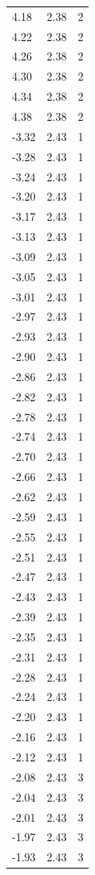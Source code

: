 \begin{longtable}{lrr}
  4.18 & 2.38 & 2 \\
  4.22 & 2.38 & 2 \\
  4.26 & 2.38 & 2 \\
  4.30 & 2.38 & 2 \\
  4.34 & 2.38 & 2 \\
  4.38 & 2.38 & 2 \\
  -3.32 & 2.43 & 1 \\
  -3.28 & 2.43 & 1 \\
  -3.24 & 2.43 & 1 \\
  -3.20 & 2.43 & 1 \\
  -3.17 & 2.43 & 1 \\
  -3.13 & 2.43 & 1 \\
  -3.09 & 2.43 & 1 \\
  -3.05 & 2.43 & 1 \\
  -3.01 & 2.43 & 1 \\
  -2.97 & 2.43 & 1 \\
  -2.93 & 2.43 & 1 \\
  -2.90 & 2.43 & 1 \\
  -2.86 & 2.43 & 1 \\
  -2.82 & 2.43 & 1 \\
  -2.78 & 2.43 & 1 \\
  -2.74 & 2.43 & 1 \\
  -2.70 & 2.43 & 1 \\
  -2.66 & 2.43 & 1 \\
  -2.62 & 2.43 & 1 \\
  -2.59 & 2.43 & 1 \\
  -2.55 & 2.43 & 1 \\
  -2.51 & 2.43 & 1 \\
  -2.47 & 2.43 & 1 \\
  -2.43 & 2.43 & 1 \\
  -2.39 & 2.43 & 1 \\
  -2.35 & 2.43 & 1 \\
  -2.31 & 2.43 & 1 \\
  -2.28 & 2.43 & 1 \\
  -2.24 & 2.43 & 1 \\
  -2.20 & 2.43 & 1 \\
  -2.16 & 2.43 & 1 \\
  -2.12 & 2.43 & 1 \\
  -2.08 & 2.43 & 3 \\
  -2.04 & 2.43 & 3 \\
  -2.01 & 2.43 & 3 \\
  -1.97 & 2.43 & 3 \\
  -1.93 & 2.43 & 3 \\

\end{longtable}
